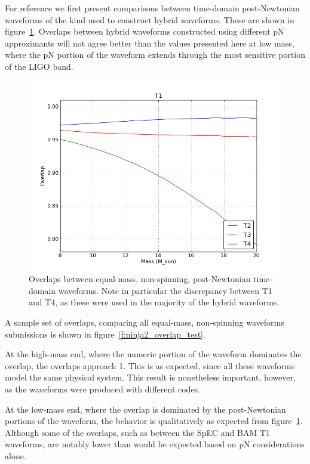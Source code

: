 For reference we first present comparisons between time-domain
post-Newtonian waveforms of the kind used to construct hybrid
waveforms.  These are shown in figure~\ref{f:pn_overlaps}.  Overlaps
between hybrid waveforms constructed using different pN approximants
will not agree better than the values presented here at low mass,
where the pN portion of the waveform extends through the most
sensitive portion of the LIGO band.


\begin{figure}
  \includegraphics[width=\linewidth]{figures/ninja2/pn_figure03}
  \caption[Overlaps between pN waveforms as a function of mass]{
  \label{f:pn_overlaps}
Overlaps between equal-mass, non-spinning, post-Newtonian time-domain 
waveforms.  Note in particular the discrepancy between T1 and T4, as
these were used in the majority of the hybrid waveforms.
}
\end{figure}%

A sample set of overlaps, comparing all equal-mass, non-spinning
waveforms submissions is shown in figure~\ref{f:ninja2_overlap_test}.

At the high-mass end, where the numeric portion of the waveform
dominates the overlap, the overlaps approach 1.  This is as expected,
since all these waveforms model the same physical system.  This result
is nonetheless important, however, as the waveforms were produced with
different codes.

At the low-mass end, where the overlap is dominated by the
post-Newtonian portions of the waveform, the behavior is qualitatively
as expected from figure~\ref{f:pn_overlaps}.  Although some of the
overlaps, such as between the SpEC and BAM T1 waveforms, are notably
lower than would be expected based on pN considerations alone.  

